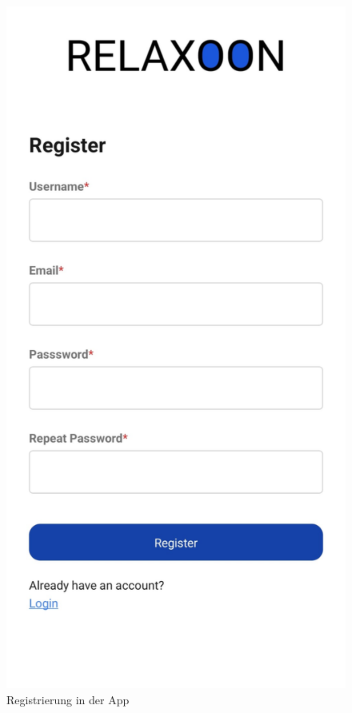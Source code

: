 \begin{figure}[H]
\begin{minipage}{0.5\textwidth}
    \end{minipage}
    \begin{minipage}{0.5\textwidth}
        \centering
        \includegraphics[height=2\textwidth]{./pics/register.jpg}
        \caption{Registrierung in der App}
    \end{minipage}
\end{figure}

